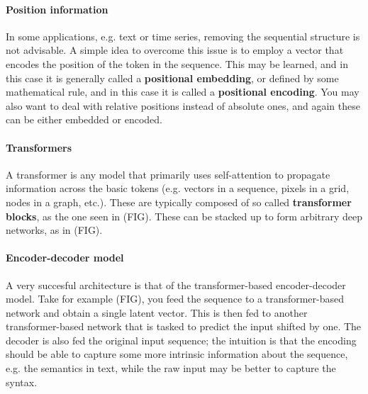 \paragraph{Position information}
In some applications,  e.g. text or time series, removing the sequential structure is not advisable.
A simple idea to overcome this issue is to employ a vector that encodes the position of the token in the sequence. This may be learned, and in this case it is generally called a \textbf{positional embedding}, or defined by some mathematical rule, and in this case it is called a \textbf{positional encoding}. You may also want to deal with relative positions instead of absolute ones, and again these can be either embedded or encoded.

\paragraph{Transformers}
A transformer is any model that primarily uses self-attention to propagate information across the basic tokens (e.g. vectors in a sequence, pixels in a grid, nodes in a graph, etc.). These are typically composed of so called \textbf{transformer blocks}, as the one seen in (FIG). These can be stacked up to form arbitrary deep networks, as in (FIG).

\paragraph{Encoder-decoder model}
A very succesful architecture is that of the transformer-based encoder-decoder model. Take for example (FIG), you feed the sequence to a transformer-based network and obtain a single latent vector. This is then fed to another transformer-based network that is tasked to predict the input shifted by one. The decoder is also fed the original input sequence; the intuition is that the encoding should be able to capture some more intrinsic information about the sequence, e.g. the semantics in text, while the raw input may be better to capture the syntax. 